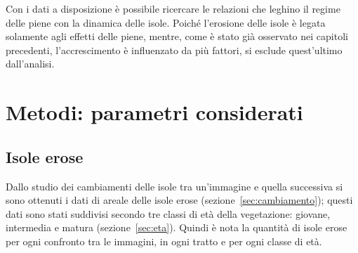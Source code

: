 \bigskip
Con i dati a disposizione è possibile ricercare le relazioni che leghino il regime delle piene con la dinamica delle isole.
Poiché l'erosione delle isole è legata solamente agli effetti delle piene, mentre, come è stato già osservato nei capitoli precedenti, l'accrescimento è influenzato da più fattori, si esclude quest'ultimo dall'analisi.

\section{Metodi: parametri considerati}

\subsection{Isole erose}
Dallo studio dei cambiamenti delle isole tra un'immagine e quella successiva si sono ottenuti i dati di areale delle isole erose (sezione~\ref{sec:cambiamento});
questi dati sono stati suddivisi secondo tre classi di età della vegetazione: giovane, intermedia e matura (sezione~\ref{sec:eta}).
Quindi è nota la quantità di isole erose per ogni confronto tra le immagini, in ogni tratto e per ogni classe di età.

